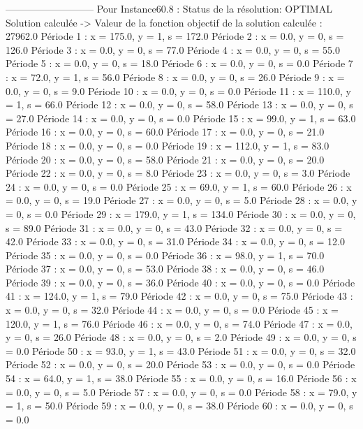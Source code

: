 ---------------------------
Pour Instance60.8  :
Status de la résolution: OPTIMAL
Solution calculée
-> Valeur de la fonction objectif de la solution calculée :  27962.0
Période 1 : x = 175.0, y = 1, s = 172.0
Période 2 : x = 0.0, y = 0, s = 126.0
Période 3 : x = 0.0, y = 0, s = 77.0
Période 4 : x = 0.0, y = 0, s = 55.0
Période 5 : x = 0.0, y = 0, s = 18.0
Période 6 : x = 0.0, y = 0, s = 0.0
Période 7 : x = 72.0, y = 1, s = 56.0
Période 8 : x = 0.0, y = 0, s = 26.0
Période 9 : x = 0.0, y = 0, s = 9.0
Période 10 : x = 0.0, y = 0, s = 0.0
Période 11 : x = 110.0, y = 1, s = 66.0
Période 12 : x = 0.0, y = 0, s = 58.0
Période 13 : x = 0.0, y = 0, s = 27.0
Période 14 : x = 0.0, y = 0, s = 0.0
Période 15 : x = 99.0, y = 1, s = 63.0
Période 16 : x = 0.0, y = 0, s = 60.0
Période 17 : x = 0.0, y = 0, s = 21.0
Période 18 : x = 0.0, y = 0, s = 0.0
Période 19 : x = 112.0, y = 1, s = 83.0
Période 20 : x = 0.0, y = 0, s = 58.0
Période 21 : x = 0.0, y = 0, s = 20.0
Période 22 : x = 0.0, y = 0, s = 8.0
Période 23 : x = 0.0, y = 0, s = 3.0
Période 24 : x = 0.0, y = 0, s = 0.0
Période 25 : x = 69.0, y = 1, s = 60.0
Période 26 : x = 0.0, y = 0, s = 19.0
Période 27 : x = 0.0, y = 0, s = 5.0
Période 28 : x = 0.0, y = 0, s = 0.0
Période 29 : x = 179.0, y = 1, s = 134.0
Période 30 : x = 0.0, y = 0, s = 89.0
Période 31 : x = 0.0, y = 0, s = 43.0
Période 32 : x = 0.0, y = 0, s = 42.0
Période 33 : x = 0.0, y = 0, s = 31.0
Période 34 : x = 0.0, y = 0, s = 12.0
Période 35 : x = 0.0, y = 0, s = 0.0
Période 36 : x = 98.0, y = 1, s = 70.0
Période 37 : x = 0.0, y = 0, s = 53.0
Période 38 : x = 0.0, y = 0, s = 46.0
Période 39 : x = 0.0, y = 0, s = 36.0
Période 40 : x = 0.0, y = 0, s = 0.0
Période 41 : x = 124.0, y = 1, s = 79.0
Période 42 : x = 0.0, y = 0, s = 75.0
Période 43 : x = 0.0, y = 0, s = 32.0
Période 44 : x = 0.0, y = 0, s = 0.0
Période 45 : x = 120.0, y = 1, s = 76.0
Période 46 : x = 0.0, y = 0, s = 74.0
Période 47 : x = 0.0, y = 0, s = 26.0
Période 48 : x = 0.0, y = 0, s = 2.0
Période 49 : x = 0.0, y = 0, s = 0.0
Période 50 : x = 93.0, y = 1, s = 43.0
Période 51 : x = 0.0, y = 0, s = 32.0
Période 52 : x = 0.0, y = 0, s = 20.0
Période 53 : x = 0.0, y = 0, s = 0.0
Période 54 : x = 64.0, y = 1, s = 38.0
Période 55 : x = 0.0, y = 0, s = 16.0
Période 56 : x = 0.0, y = 0, s = 5.0
Période 57 : x = 0.0, y = 0, s = 0.0
Période 58 : x = 79.0, y = 1, s = 50.0
Période 59 : x = 0.0, y = 0, s = 38.0
Période 60 : x = 0.0, y = 0, s = 0.0



